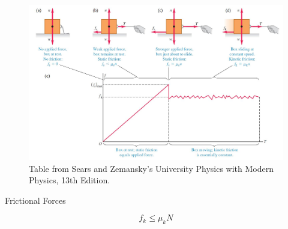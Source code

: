 \documentclass[]{beamer}
\begin{document}


    \begin{frame}
      
 
         
         \begin{figure}[h!]  
           \includegraphics[width=1.\textwidth]{images/f21.jpg}
           \caption{ {\tiny Table from Sears and Zemansky's University Physics 
           with Modern Physics, 13th Edition.} }
         \end{figure}
     
               \end{frame}







    \begin{frame}
      
      Frictional Forces
    \vspace{3mm}
    
\begin{equation}
  f_k\leq\mu_k N
\end{equation}


          \end{frame}


      
\end{document}
